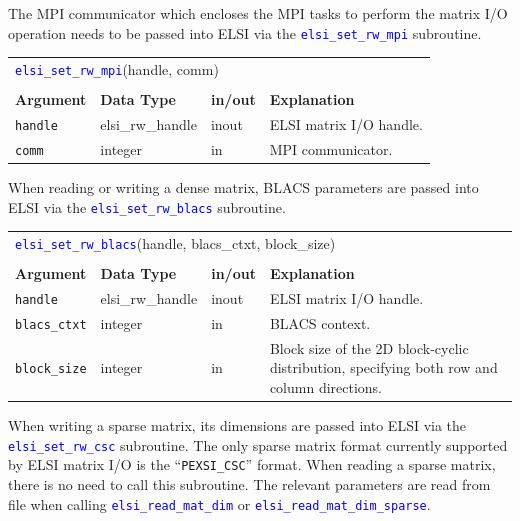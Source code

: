\documentclass{report}
\newcommand{\api}[1]{\textcolor{blue}{\texttt{#1}}}
\begin{document}
The MPI communicator which encloses the MPI tasks to perform the matrix I/O operation needs to be passed into ELSI via the \api{elsi\_set\_rw\_mpi} subroutine.

\begin{tabular}[]{|p{25mm}|p{25mm}|p{10mm}|p{102mm}|}
\multicolumn{4}{l}{\api{elsi\_set\_rw\_mpi}(handle, comm)}\\
\multicolumn{4}{l}{}\\
\hline
\multicolumn{1}{|l|}{\textbf{Argument}} & \multicolumn{1}{l|}{\textbf{Data Type}} & \multicolumn{1}{l|}{\textbf{in/out}} & \multicolumn{1}{l|}{\textbf{Explanation}}\\
\hline
\texttt{handle} & elsi\_rw\_handle & inout & ELSI matrix I/O handle.\\
\hline
\texttt{comm}   & integer          & in    & MPI communicator.\\
\hline
\end{tabular}

When reading or writing a dense matrix, BLACS parameters are passed into ELSI via the \api{elsi\_set\_rw\_blacs} subroutine.

\begin{tabular}[]{|p{25mm}|p{25mm}|p{10mm}|p{102mm}|}
\multicolumn{4}{l}{\api{elsi\_set\_rw\_blacs}(handle, blacs\_ctxt, block\_size)}\\
\multicolumn{4}{l}{}\\
\hline
\multicolumn{1}{|l|}{\textbf{Argument}} & \multicolumn{1}{l|}{\textbf{Data Type}} & \multicolumn{1}{l|}{\textbf{in/out}} & \multicolumn{1}{l|}{\textbf{Explanation}}\\
\hline
\texttt{handle}      & elsi\_rw\_handle & inout & ELSI matrix I/O handle.\\
\hline
\texttt{blacs\_ctxt} & integer          & in    & BLACS context.\\
\hline
\texttt{block\_size} & integer          & in    & Block size of the 2D block-cyclic distribution, specifying both row and column directions.\\
\hline
\end{tabular}

When writing a sparse matrix, its dimensions are passed into ELSI via the \api{elsi\_set\_rw\_csc} subroutine. The only sparse matrix format currently supported by ELSI matrix I/O is the ``\texttt{PEXSI\_CSC}'' format. When reading a sparse matrix, there is no need to call this subroutine. The relevant parameters are read from file when calling \api{elsi\_read\_mat\_dim} or \api{elsi\_read\_mat\_dim\_sparse}.
\end{document}
